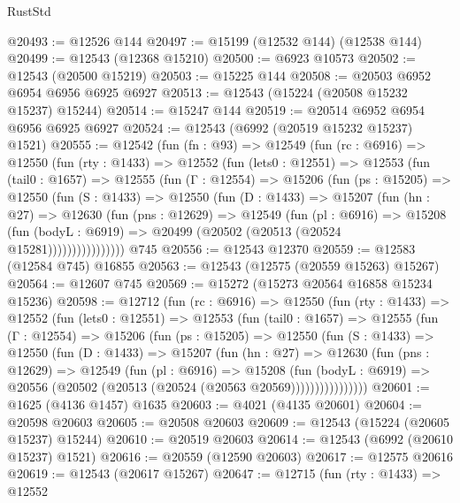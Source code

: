\begin{lexlean}{RustStd}
\begin{coremodule}
@20493 := @12526 @144
@20497 := @15199 (@12532 @144) (@12538 @144)
@20499 := @12543 (@12368 @15210)
@20500 := @6923 @10573
@20502 := @12543 (@20500 @15219)
@20503 := @15225 @144
@20508 := @20503 @6952 @6954 @6956 @6925 @6927
@20513 := @12543 (@15224 (@20508 @15232 @15237) @15244)
@20514 := @15247 @144
@20519 := @20514 @6952 @6954 @6956 @6925 @6927
@20524 := @12543 (@6992 (@20519 @15232 @15237) @1521)
@20555 := @12542
    (fun (fn : @93) =>
    @12549
      (fun (rc : @6916) =>
      @12550
        (fun (rty : @1433) =>
        @12552
          (fun (lets0 : @12551) =>
          @12553
            (fun (tail0 : @1657) =>
            @12555
              (fun (Γ : @12554) =>
              @15206
                (fun (ps : @15205) =>
                @12550
                  (fun (S : @1433) =>
                  @12550
                    (fun (D : @1433) =>
                    @15207
                      (fun (hn : @27) =>
                      @12630
                        (fun (pns : @12629) =>
                        @12549
                          (fun (pl : @6916) =>
                          @15208
                            (fun (bodyL : @6919) =>
                            @20499 (@20502 (@20513 (@20524 @15281))))))))))))))))
    @745
@20556 := @12543 @12370
@20559 := @12583 (@12584 @745) @16855
@20563 := @12543 (@12575 (@20559 @15263) @15267)
@20564 := @12607 @745
@20569 := @15272 (@15273 @20564 @16858 @15234 @15236)
@20598 := @12712
    (fun (rc : @6916) =>
    @12550
      (fun (rty : @1433) =>
      @12552
        (fun (lets0 : @12551) =>
        @12553
          (fun (tail0 : @1657) =>
          @12555
            (fun (Γ : @12554) =>
            @15206
              (fun (ps : @15205) =>
              @12550
                (fun (S : @1433) =>
                @12550
                  (fun (D : @1433) =>
                  @15207
                    (fun (hn : @27) =>
                    @12630
                      (fun (pns : @12629) =>
                      @12549
                        (fun (pl : @6916) =>
                        @15208
                          (fun (bodyL : @6919) =>
                          @20556 (@20502 (@20513 (@20524 (@20563 @20569))))))))))))))))
@20601 := @1625 (@4136 @1457) @1635
@20603 := @4021 (@4135 @20601)
@20604 := @20598 @20603
@20605 := @20508 @20603
@20609 := @12543 (@15224 (@20605 @15237) @15244)
@20610 := @20519 @20603
@20614 := @12543 (@6992 (@20610 @15237) @1521)
@20616 := @20559 (@12590 @20603)
@20617 := @12575 @20616
@20619 := @12543 (@20617 @15267)
@20647 := @12715
    (fun (rty : @1433) =>
    @12552

\end{coremodule}
\end{lexlean}
